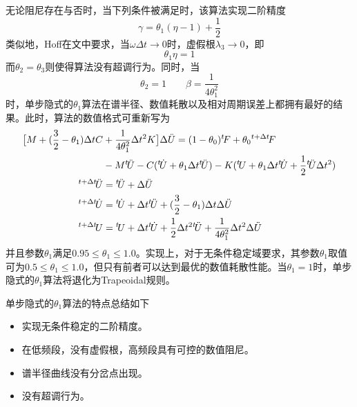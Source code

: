 无论阻尼存在与否时，当下列条件被满足时，该算法实现二阶精度
\begin{equation}
\gamma=\theta_1(\eta-1)+\frac{1}{2}
\end{equation}
类似地，Hoff在文中要求，当$\omega\Delta t\to0$时，虚假根$\lambda_3\to0$，即
\begin{equation}
\theta_1\eta=1
\end{equation}
而$\theta_2=\theta_3$则使得算法没有超调行为。同时，当
\begin{equation}
\theta_2=1\qquad \beta=\frac{1}{4\theta_1^2}
\end{equation}
时，单步隐式的$\theta_1$算法在谱半径、数值耗散以及相对周期误差上都拥有最好的结果。此时，算法的数值格式可重新写为
\begin{subequations}
\begin{align}
\big[ M+(\frac{3}{2}-\theta_1)\Delta tC&+\frac{1}{4\theta_1^2}\Delta t^2K \big]\Delta\ddot{U}=(1-\theta_0){^t\!F}+\theta_0{^{t+\Delta t}\!F}\\
&-M{^t\!\ddot{U}}-C({^t\!\dot{U}}+\theta_1\Delta t{^t\!\ddot{U}})-K({^t\!U}+\theta_1\Delta t{^t\!\dot{U}}+\frac{1}{2}{^t\!\ddot{U}}\Delta t^2)\notag\\
{^{t+\Delta t}\!\ddot{U}}&={^t\!\ddot{U}}+\Delta \ddot{U}\\
{^{t+\Delta t}\!\dot{U}}&={^t\!\dot{U}}+\Delta t{^t\!\ddot{U}}+(\frac{3}{2}-\theta_1)\Delta t\Delta\ddot{U}\\
{^{t+\Delta t}\!U}&={^t\!U}+\Delta t{^t\!\dot{U}}+\frac12\Delta t^2{^t\!\ddot{U}}+\frac{1}{4\theta_1^2}\Delta t^2\Delta\ddot{U}
\end{align}
\end{subequations}
并且参数$\theta_1$满足$0.95\le\theta_1\le1.0$。实现上，对于无条件稳定域要求，其参数$\theta_1$取值可为$0.5\le\theta_1\le1.0$，但只有前者可以达到最优的数值耗散性能。当$\theta_1=1$时，单步隐式的$\theta_1$算法将退化为Trapeoidal规则。

单步隐式的$\theta_1$算法的特点总结如下
\begin{itemize}
\item[\ddag] 实现无条件稳定的二阶精度。
\item[\ddag] 在低频段，没有虚假根，高频段具有可控的数值阻尼。
\item[\ddag] 谱半径曲线没有分岔点出现。
\item[\ddag] 没有超调行为。
\end{itemize}

